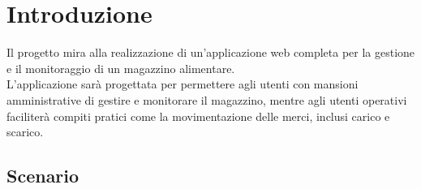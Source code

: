 \section{Introduzione}

Il progetto mira alla realizzazione di un'applicazione web completa per la gestione e il monitoraggio di un magazzino alimentare.\\
L'applicazione sarà progettata per permettere agli utenti con mansioni amministrative di gestire e monitorare il
magazzino, mentre agli utenti operativi faciliterà compiti pratici come la movimentazione delle merci, inclusi carico e scarico.

\subsection{Scenario}


